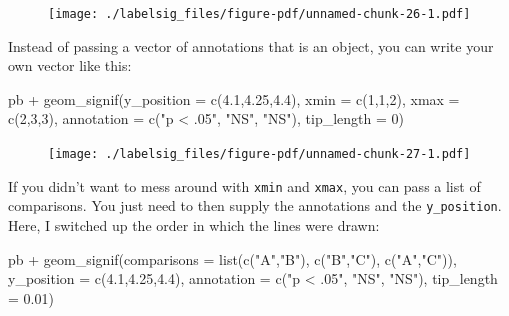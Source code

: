 \documentclass[
  letterpaper,
  DIV=11,
  numbers=noendperiod]{scrreprt}
\newenvironment{Shaded}{\begin{snugshade}}{\end{snugshade}}
\newcommand{\AttributeTok}[1]{\textcolor[rgb]{0.40,0.45,0.13}{#1}}
\newcommand{\DecValTok}[1]{\textcolor[rgb]{0.68,0.00,0.00}{#1}}
\newcommand{\FloatTok}[1]{\textcolor[rgb]{0.68,0.00,0.00}{#1}}
\newcommand{\FunctionTok}[1]{\textcolor[rgb]{0.28,0.35,0.67}{#1}}
\newcommand{\NormalTok}[1]{\textcolor[rgb]{0.00,0.23,0.31}{#1}}
\newcommand{\SpecialCharTok}[1]{\textcolor[rgb]{0.37,0.37,0.37}{#1}}
\newcommand{\StringTok}[1]{\textcolor[rgb]{0.13,0.47,0.30}{#1}}
\begin{document}
\begin{figure}[H]

{\centering \texttt{[image: ./labelsig\_files/figure-pdf/unnamed-chunk-26-1.pdf]}

}

\end{figure}

Instead of passing a vector of annotations that is an object, you can
write your own vector like this:

\begin{Shaded}
\begin{Highlighting}[]
\NormalTok{pb }\SpecialCharTok{+} 
  \FunctionTok{geom\_signif}\NormalTok{(}\AttributeTok{y\_position =} \FunctionTok{c}\NormalTok{(}\FloatTok{4.1}\NormalTok{,}\FloatTok{4.25}\NormalTok{,}\FloatTok{4.4}\NormalTok{), }
              \AttributeTok{xmin =} \FunctionTok{c}\NormalTok{(}\DecValTok{1}\NormalTok{,}\DecValTok{1}\NormalTok{,}\DecValTok{2}\NormalTok{), }
              \AttributeTok{xmax =} \FunctionTok{c}\NormalTok{(}\DecValTok{2}\NormalTok{,}\DecValTok{3}\NormalTok{,}\DecValTok{3}\NormalTok{), }
              \AttributeTok{annotation =} \FunctionTok{c}\NormalTok{(}\StringTok{"p \textless{} .05"}\NormalTok{, }\StringTok{"NS"}\NormalTok{, }\StringTok{"NS"}\NormalTok{),}
              \AttributeTok{tip\_length =} \DecValTok{0}\NormalTok{) }
\end{Highlighting}
\end{Shaded}

\begin{figure}[H]

{\centering \texttt{[image: ./labelsig\_files/figure-pdf/unnamed-chunk-27-1.pdf]}

}

\end{figure}

If you didn't want to mess around with \texttt{xmin} and \texttt{xmax},
you can pass a list of comparisons. You just need to then supply the
annotations and the \texttt{y\_position}. Here, I switched up the order
in which the lines were drawn:

\begin{Shaded}
\begin{Highlighting}[]
\NormalTok{pb }\SpecialCharTok{+}
  \FunctionTok{geom\_signif}\NormalTok{(}\AttributeTok{comparisons =} \FunctionTok{list}\NormalTok{(}\FunctionTok{c}\NormalTok{(}\StringTok{"A"}\NormalTok{,}\StringTok{"B"}\NormalTok{),}
                                 \FunctionTok{c}\NormalTok{(}\StringTok{"B"}\NormalTok{,}\StringTok{"C"}\NormalTok{),}
                                 \FunctionTok{c}\NormalTok{(}\StringTok{"A"}\NormalTok{,}\StringTok{"C"}\NormalTok{)), }
              \AttributeTok{y\_position =} \FunctionTok{c}\NormalTok{(}\FloatTok{4.1}\NormalTok{,}\FloatTok{4.25}\NormalTok{,}\FloatTok{4.4}\NormalTok{),}
             \AttributeTok{annotation =} \FunctionTok{c}\NormalTok{(}\StringTok{"p \textless{} .05"}\NormalTok{, }\StringTok{"NS"}\NormalTok{, }\StringTok{"NS"}\NormalTok{),}
              \AttributeTok{tip\_length =} \FloatTok{0.01}\NormalTok{)}
\end{Highlighting}
\end{Shaded}
\end{document}

